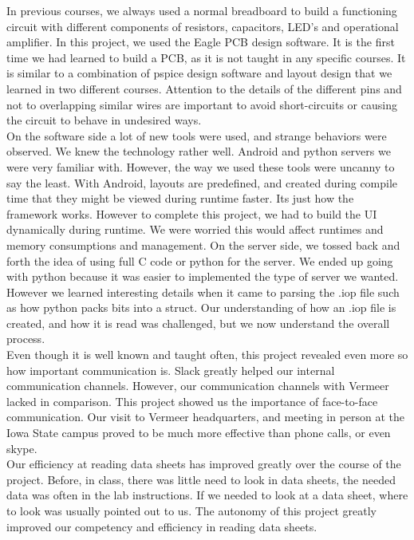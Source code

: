 \documentclass[paper=a4, fontsize=11pt]{scrartcl}
\numberwithin{equation}{section}		%
\numberwithin{figure}{section}			%
\numberwithin{table}{section}				%
\begin{document}
In previous courses, we always used a normal breadboard to build a functioning circuit with different components of resistors, capacitors, LED's and operational amplifier. In this project, we used the Eagle PCB design software. It is the first time we had learned to build a PCB, as it is not taught in any specific courses. It is similar to a combination of pspice design software and layout design that we learned in two different courses. Attention to the details of the different pins and not to overlapping similar wires are important to avoid short-circuits or causing the circuit to behave in undesired ways.\\

On the software side a lot of new tools were used, and strange behaviors were observed. We knew the technology rather well. Android and python servers we were very familiar with. However, the way we used these tools were uncanny to say the least. With Android, layouts are predefined, and created during compile time that they might be viewed during runtime faster. Its just how the framework works. However to complete this project, we had to build the UI dynamically during runtime. We were worried this would affect runtimes and memory consumptions and management. On the server side, we tossed back and forth the idea of using full C code or python for the server. We ended up going with python because it was easier to implemented the type of server we wanted. However we learned interesting details when it came to parsing the .iop file such as how python packs bits into a struct. Our understanding of how an .iop file is created, and how it is read was challenged, but we now understand the overall process.\\

Even though it is well known and taught often, this project revealed even more so how important communication is. Slack greatly helped our internal communication channels. However, our communication channels with Vermeer lacked in comparison. This project showed us the importance of face-to-face communication. Our visit to Vermeer headquarters, and meeting in person at the Iowa State campus proved to be much more effective than phone calls, or even skype.\\

Our efficiency at reading data sheets has improved greatly over the course of the project. Before, in class, there was little need to look in data sheets, the needed data was often in the lab instructions. If we needed to look at a data sheet, where to look was usually pointed out to us. The autonomy of this project greatly improved our competency and efficiency in reading data sheets.\\
\end{document}
